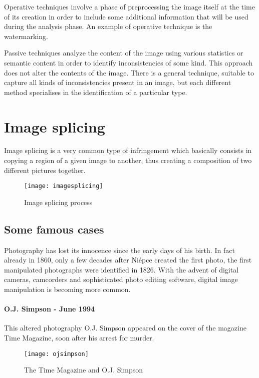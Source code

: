 Operative techniques involve a phase of preprocessing the image itself at the time of its creation in order to include some additional information that will be used during the analysis phase. An example of operative technique is the watermarking.

Passive techniques analyze the content of the image using various statistics or semantic content in order to identify inconsistencies of some kind. This approach does not alter the contents of the image.
There is a general technique, suitable to capture all kinds of inconsistencies present in an image, but each different method specialises in the identification of a particular type.

\section{Image splicing}

Image splicing is a very common type of infringement which basically consists in copying a region of a given image to another, thus creating a composition of two different pictures together.

\begin{figure}
  \centering
    \texttt{[image: imagesplicing]}
    \caption{Image splicing process}
\end{figure}


\subsection{Some famous cases}

Photography has lost its innocence since the early days of his birth. In fact already in 1860, only a few decades after Niépce created the first photo, the first manipulated photographs were identified in 1826. With the advent of digital cameras, camcorders and sophisticated photo editing software, digital image manipulation is becoming more common. 

\paragraph{O.J. Simpson - June 1994}

This altered photography O.J. Simpson appeared on the cover of the magazine Time Magazine, soon after his arrest for murder. 

\begin{wrapfigure}{r}{0.5\textwidth}
  \begin{center}
    \texttt{[image: ojsimpson]}
  \end{center}
  \caption{The Time Magazine and O.J. Simpson}
  \vspace{-1cm}
\end{wrapfigure}

